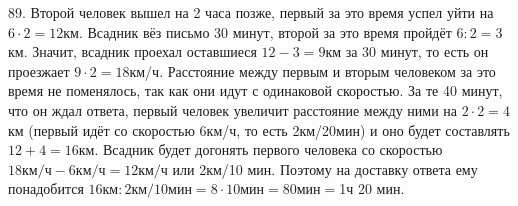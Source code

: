 89. Второй человек вышел на 2 часа позже, первый за это время успел уйти на $6\cdot2=12$км. Всадник вёз письмо 30 минут, второй за это время пройдёт $6:2=3$км. Значит, всадник проехал оставшиеся $12-3=9$км за 30 минут, то есть он проезжает $9\cdot2=18$км/ч. Расстояние между первым и вторым человеком за это время не поменялось, так как они идут с одинаковой скоростью. За те 40 минут, что он ждал ответа, первый человек увеличит расстояние между ними на $2\cdot2=4$км (первый идёт со скоростью 6км/ч, то есть 2км/20мин) и оно будет составлять $12+4=16$км. Всадник будет догонять первого человека со скоростью $18\text{км/ч}-6\text{км/ч}=12\text{км/ч}$ или 2км/10 мин. Поэтому на доставку ответа ему понадобится $16\text{км}:2\text{км/10мин}=8\cdot10\text{мин}=80\text{мин}=$1ч 20 мин.\\
